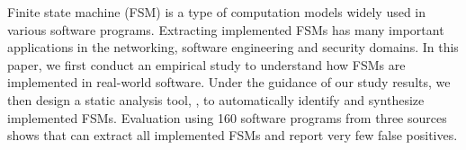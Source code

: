 Finite state machine (FSM) is a type of computation models widely
used in various software programs.
Extracting implemented FSMs has many important applications in the
networking, software engineering and security domains.
In this paper, we first conduct an empirical study to understand 
how FSMs are implemented in real-world software.
Under the guidance of our study results, we then design a static analysis tool, 
\Tool{}, to automatically identify and synthesize implemented FSMs.
Evaluation using 160 software programs from three sources shows that
\Tool{} can extract all implemented FSMs 
and report very few false positives.



